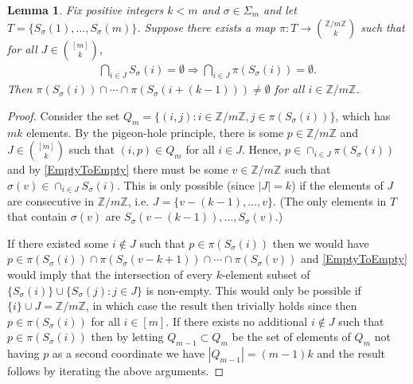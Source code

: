 \documentclass[journal, onecolumn]{IEEEtran}
\newtheorem{lemma}{Lemma}
\begin{document}

\begin{lemma}\label{NonEmptyLemma} Fix positive integers $k < m$ and $\sigma \in \Sigma_m$ and let $T = \{S_\sigma(1), \ldots, S_\sigma(m)\}$. Suppose there exists a map $\pi: T \to {\mathbb{Z}/m\mathbb{Z} \choose k}$ such that for all $J \in {[m] \choose k}$,
\begin{align}\label{EmptyToEmpty}
 \bigcap_{i \in J} S_\sigma(i) = \emptyset \Longrightarrow \bigcap_{i \in J} \pi(S_\sigma(i)) = \emptyset.
\end{align}
%
Then  $\pi(S_\sigma(i)) \cap \cdots \cap \pi(S_\sigma(i+(k-1))) \neq \emptyset$ for all $i \in \mathbb{Z}/m\mathbb{Z}$.
\end{lemma}

\begin{proof} Consider the set $Q_m = \{ (i,j) : i \in \mathbb{Z}/m\mathbb{Z}, j \in \pi(S_\sigma(i)) \}$, which has $mk$ elements. By the pigeon-hole principle, there is some $p \in \mathbb{Z}/m\mathbb{Z}$ and $J \in {[m] \choose k}$ such that $(i, p) \in Q_m$ for all $i \in J$. Hence, $p \in \cap_{i \in J} \pi(S_\sigma(i))$ and by \eqref{EmptyToEmpty} there must be some $v \in \mathbb{Z}/m\mathbb{Z}$ such that $\sigma(v) \in \cap_{i \in J} S_\sigma(i)$. This is only possible (since $|J| = k$) if the elements of $J$ are consecutive in $\mathbb{Z}/m\mathbb{Z}$, i.e. $J = \{v - (k-1), \ldots, v\}$. (The only elements in $T$ that contain $\sigma(v)$ are $S_\sigma(v-(k-1)), \ldots, S_\sigma(v)$.)

If there existed some $i \notin J$ such that $p \in \pi(S_\sigma(i))$ then we would have $p \in \pi(S_\sigma(i)) \cap \pi(S_\sigma(v - k+1)) \cap \cdots \cap \pi(S_\sigma(v))$ and \eqref{EmptyToEmpty} would imply that the intersection of every $k$-element subset of $\{S_\sigma(i)\} \cup \{S_\sigma(j): j \in J\}$ is non-empty. This would only be possible if $\{i\} \cup J = \mathbb{Z}/m\mathbb{Z}$, in which case the result then trivially holds since then $p \in \pi(S_\sigma(i))$ for all $i \in [m]$. If there exists no additional $i \notin J$ such that $p \in \pi(S_\sigma(i))$ then by letting $Q_{m-1} \subset Q_m$ be the set of elements of $Q_m$ not having $p$ as a second coordinate we have $|Q_{m-1}| = (m-1)k$ and the result follows by iterating the above arguments.
\end{proof}

\end{document}
